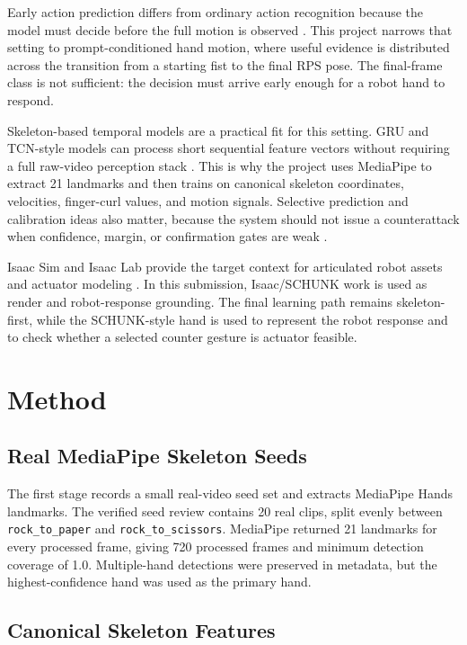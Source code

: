 \documentclass[conference]{IEEEtran}
\begin{document}
Early action prediction differs from ordinary action recognition because the model must decide before the full motion is observed \cite{kong2018survey,ke2019latent}. This project narrows that setting to prompt-conditioned hand motion, where useful evidence is distributed across the transition from a starting fist to the final RPS pose. The final-frame class is not sufficient: the decision must arrive early enough for a robot hand to respond.

Skeleton-based temporal models are a practical fit for this setting. GRU and TCN-style models can process short sequential feature vectors without requiring a full raw-video perception stack \cite{chung2014gru}. This is why the project uses MediaPipe to extract 21 landmarks and then trains on canonical skeleton coordinates, velocities, finger-curl values, and motion signals. Selective prediction and calibration ideas also matter, because the system should not issue a counterattack when confidence, margin, or confirmation gates are weak \cite{geifman2017selective,guo2017calibration}.

Isaac Sim and Isaac Lab provide the target context for articulated robot assets and actuator modeling \cite{isaacsim,isaaclabactuators}. In this submission, Isaac/SCHUNK work is used as render and robot-response grounding. The final learning path remains skeleton-first, while the SCHUNK-style hand is used to represent the robot response and to check whether a selected counter gesture is actuator feasible.

\section{Method}

\subsection{Real MediaPipe Skeleton Seeds}

The first stage records a small real-video seed set and extracts MediaPipe Hands landmarks. The verified seed review contains 20 real clips, split evenly between \texttt{rock\_to\_paper} and \texttt{rock\_to\_scissors}. MediaPipe returned 21 landmarks for every processed frame, giving 720 processed frames and minimum detection coverage of 1.0. Multiple-hand detections were preserved in metadata, but the highest-confidence hand was used as the primary hand.

\subsection{Canonical Skeleton Features}
\end{document}
